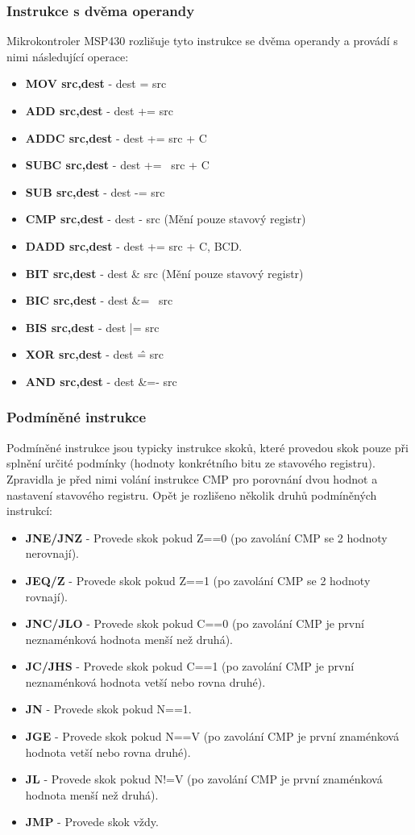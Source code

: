 \subsubsection{Instrukce s dvěma operandy}

Mikrokontroler MSP430 rozlišuje tyto instrukce se dvěma operandy a provádí s nimi následující operace:

\begin{itemize}
\item \textbf{MOV src,dest} - dest = src
\item \textbf{ADD src,dest} - dest += src
\item \textbf{ADDC src,dest} - dest += src + C
\item \textbf{SUBC src,dest} - dest += ~src + C
\item \textbf{SUB src,dest} - dest -= src
\item \textbf{CMP src,dest} - dest - src (Mění pouze stavový registr)
\item \textbf{DADD src,dest} - dest += src + C, BCD.
\item \textbf{BIT src,dest} - dest \& src (Mění pouze stavový registr)
\item \textbf{BIC src,dest} - dest \&= ~src
\item \textbf{BIS src,dest} - dest |= src
\item \textbf{XOR src,dest} - dest \^ = src
\item \textbf{AND src,dest} - dest \&=- src
\end{itemize}

\subsubsection{Podmíněné instrukce}

Podmíněné instrukce jsou typicky instrukce skoků, které provedou skok pouze při splnění určité podmínky (hodnoty konkrétního bitu ze stavového registru). Zpravidla je před nimi volání instrukce CMP pro porovnání dvou hodnot a nastavení stavového registru. Opět je rozlišeno několik druhů podmíněných instrukcí:

\begin{itemize}
\item \textbf{JNE/JNZ} - Provede skok pokud Z==0 (po zavolání CMP se 2 hodnoty nerovnají).
\item \textbf{JEQ/Z} - Provede skok pokud Z==1 (po zavolání CMP se 2 hodnoty rovnají).
\item \textbf{JNC/JLO} - Provede skok pokud C==0 (po zavolání CMP je první neznaménková hodnota menší než druhá).
\item \textbf{JC/JHS} - Provede skok pokud C==1 (po zavolání CMP je první neznaménková hodnota vetší nebo rovna druhé).
\item \textbf{JN} - Provede skok pokud N==1.
\item \textbf{JGE} - Provede skok pokud N==V (po zavolání CMP je první znaménková hodnota vetší nebo rovna druhé).
\item \textbf{JL} - Provede skok pokud N!=V (po zavolání CMP je první znaménková hodnota menší než druhá).
\item \textbf{JMP} - Provede skok vždy.
\end{itemize}

